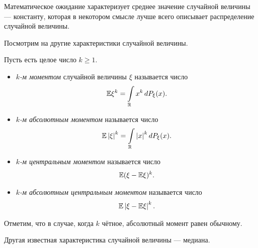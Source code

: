\documentclass[../main.tex]{subfiles}
\begin{document}
Математическое ожидание характеризует среднее значение случайной величины --- константу, которая в некотором смысле лучше всего описывает распределение случайной величины. 

Посмотрим на другие характеристики случайной величины.

\begin{df}
 Пусть есть целое число $ k \geqslant 1 $.
 \begin{itemize}
  \item \textit{$ k $-м моментом} случайной величины $ \xi $ называется число
   \begin{align*}
    \mathbb E \xi^{k} = \int\limits_{\mathbb{R}} x^{k}\,dP_\xi(x). 
   \end{align*}
  \item \textit{$ k $-м абсолютным моментом} называется число
   \begin{align*}
    \mathbb E \left| \xi \right|^{k} = \int\limits_{\mathbb{R}} \left| x \right|^{k}dP_\xi(x). 
   \end{align*}
  \item \textit{$ k $-м центральным моментом} называется число
   \begin{align*}
    \mathbb E (\xi - \mathbb E \xi)^{k}.
   \end{align*}
  \item \textit{$ k $-м абсолютным центральным моментом} называется число
   \begin{align*}
    \mathbb E \left| \xi - \mathbb E\xi \right|^{k}.
   \end{align*}
 \end{itemize}
\end{df}

Отметим, что в случае, когда $ k $  чётное, абсолютный момент равен обычному.

Другая известная характеристика случайной величины --- медиана.
\end{document}
